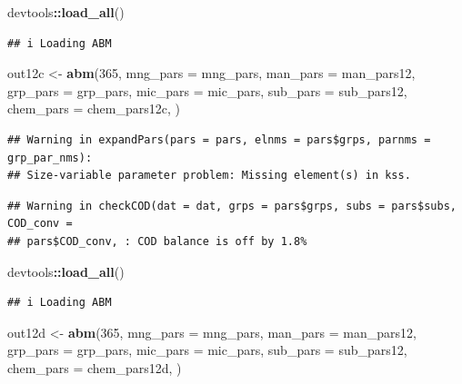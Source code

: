 \documentclass[
]{article}
\newenvironment{Shaded}{\begin{snugshade}}{\end{snugshade}}
\newcommand{\AttributeTok}[1]{\textcolor[rgb]{0.13,0.29,0.53}{#1}}
\newcommand{\DecValTok}[1]{\textcolor[rgb]{0.00,0.00,0.81}{#1}}
\newcommand{\FunctionTok}[1]{\textcolor[rgb]{0.13,0.29,0.53}{\textbf{#1}}}
\newcommand{\NormalTok}[1]{#1}
\newcommand{\OtherTok}[1]{\textcolor[rgb]{0.56,0.35,0.01}{#1}}
\newcommand{\SpecialCharTok}[1]{\textcolor[rgb]{0.81,0.36,0.00}{\textbf{#1}}}
\begin{document}
\begin{Shaded}
\begin{Highlighting}[]
\NormalTok{devtools}\SpecialCharTok{::}\FunctionTok{load\_all}\NormalTok{()}
\end{Highlighting}
\end{Shaded}

\begin{verbatim}
## i Loading ABM
\end{verbatim}

\begin{Shaded}
\begin{Highlighting}[]
\NormalTok{out12c }\OtherTok{\textless{}{-}} \FunctionTok{abm}\NormalTok{(}\DecValTok{365}\NormalTok{,}
             \AttributeTok{mng\_pars =}\NormalTok{ mng\_pars,}
             \AttributeTok{man\_pars =}\NormalTok{ man\_pars12,}
             \AttributeTok{grp\_pars =}\NormalTok{ grp\_pars,}
             \AttributeTok{mic\_pars =}\NormalTok{ mic\_pars,}
             \AttributeTok{sub\_pars =}\NormalTok{ sub\_pars12,}
             \AttributeTok{chem\_pars =}\NormalTok{ chem\_pars12c,}
\NormalTok{)}
\end{Highlighting}
\end{Shaded}

\begin{verbatim}
## Warning in expandPars(pars = pars, elnms = pars$grps, parnms = grp_par_nms):
## Size-variable parameter problem: Missing element(s) in kss.
\end{verbatim}

\begin{verbatim}
## Warning in checkCOD(dat = dat, grps = pars$grps, subs = pars$subs, COD_conv =
## pars$COD_conv, : COD balance is off by 1.8%
\end{verbatim}

\begin{Shaded}
\begin{Highlighting}[]
\NormalTok{devtools}\SpecialCharTok{::}\FunctionTok{load\_all}\NormalTok{()}
\end{Highlighting}
\end{Shaded}

\begin{verbatim}
## i Loading ABM
\end{verbatim}

\begin{Shaded}
\begin{Highlighting}[]
\NormalTok{out12d }\OtherTok{\textless{}{-}} \FunctionTok{abm}\NormalTok{(}\DecValTok{365}\NormalTok{,}
             \AttributeTok{mng\_pars =}\NormalTok{ mng\_pars,}
             \AttributeTok{man\_pars =}\NormalTok{ man\_pars12,}
             \AttributeTok{grp\_pars =}\NormalTok{ grp\_pars,}
             \AttributeTok{mic\_pars =}\NormalTok{ mic\_pars,}
             \AttributeTok{sub\_pars =}\NormalTok{ sub\_pars12,}
             \AttributeTok{chem\_pars =}\NormalTok{ chem\_pars12d,}
\NormalTok{)}
\end{Highlighting}
\end{Shaded}
\end{document}
